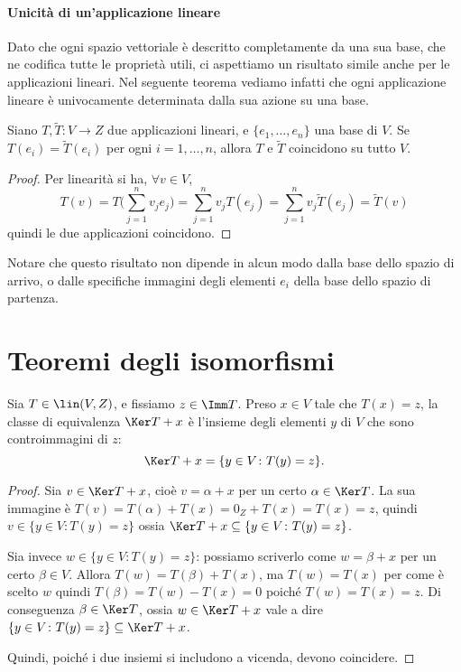\paragraph{Unicità di un'applicazione lineare}
Dato che ogni spazio vettoriale è descritto completamente da una sua base, che ne codifica tutte le proprietà utili, ci aspettiamo un risultato simile anche per le applicazioni lineari.
Nel seguente teorema vediamo infatti che ogni applicazione lineare è univocamente determinata dalla sua azione su una base.
\begin{teorema} \label{t:unicita-applicazione-lineare}
	Siano $T,\tilde T\colon V\to Z$ due applicazioni lineari, e $\{e_1,\dots,e_n\}$ una base di $V$.
	Se $T(e_i)=\tilde T(e_i)$ per ogni $i=1,\dots,n$, allora $T$ e $\tilde T$ coincidono su tutto $V$.
\end{teorema}
\begin{proof}
	Per linearità si ha, $\forall v\in V$,
	\begin{equation}
		T(v)=T\bigg(\!\sum_{j=1}^nv_je_j\bigg)=\sum_{j=1}^nv_jT(e_j)=\sum_{j=1}^nv_j\tilde T(e_j)=\tilde T(v)
	\end{equation}
	quindi le due applicazioni coincidono.
\end{proof}
Notare che questo risultato non dipende in alcun modo dalla base dello spazio di arrivo, o dalle specifiche immagini degli elementi $e_i$ della base dello spazio di partenza.

\section{Teoremi degli isomorfismi}
\begin{teorema}
	Sia $T\in\lin(V,Z)$, e fissiamo $z\in \Imm T$.
	Preso $x\in V$ tale che $T(x)=z$, la classe di equivalenza $\Ker T+x$ è l'insieme degli elementi $y$ di $V$ che sono controimmagini di $z$:
	\begin{equation*}
		 \Ker T+x=\{y\in V\colon T(y)=z\}.
	\end{equation*}
\end{teorema}
\begin{proof}
	Sia $v\in\Ker T+x$, cioè $v=\alpha+x$ per un certo $\alpha\in\Ker T$.
	La sua immagine è $T(v)=T(\alpha)+T(x)=0_Z+T(x)=T(x)=z$, quindi $v\in\{y\in V\colon T(y)=z\}$ ossia $\Ker T+x\subseteq\{y\in V\colon T(y)=z\}$.

	Sia invece $w\in\{y\in V\colon T(y)=z\}$: possiamo scriverlo come $w=\beta+x$ per un certo $\beta\in V$.
	Allora $T(w)=T(\beta)+T(x)$, ma $T(w)=T(x)$ per come è scelto $w$ quindi $T(\beta)=T(w)-T(x)=0$ poich\'e $T(w)=T(x)=z$.
	Di conseguenza $\beta\in\Ker T$, ossia $w\in\Ker T+x$ vale a dire $\{y\in V\colon T(y)=z\}\subseteq\Ker T+x$.

	Quindi, poiché i due insiemi si includono a vicenda, devono coincidere.
\end{proof}


